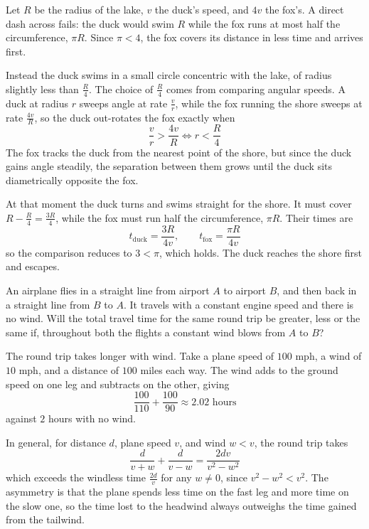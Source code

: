 \begin{solution}
Let $R$ be the radius of the lake, $v$ the duck's speed, and $4v$ the fox's. A direct dash across fails: the duck would swim $R$ while the fox runs at most half the circumference, $\pi R$. Since $\pi < 4$, the fox covers its distance in less time and arrives first.

Instead the duck swims in a small circle concentric with the lake, of radius slightly less than $\tfrac{R}{4}$. The choice of $\tfrac{R}{4}$ comes from comparing angular speeds. A duck at radius $r$ sweeps angle at rate $\tfrac{v}{r}$, while the fox running the shore sweeps at rate $\tfrac{4v}{R}$, so the duck out-rotates the fox exactly when
\[
\frac{v}{r} > \frac{4v}{R} \iff r < \frac{R}{4}
\]
The fox tracks the duck from the nearest point of the shore, but since the duck gains angle steadily, the separation between them grows until the duck sits diametrically opposite the fox.

At that moment the duck turns and swims straight for the shore. It must cover $R - \tfrac{R}{4} = \tfrac{3R}{4}$, while the fox must run half the circumference, $\pi R$. Their times are
\[
t_{\text{duck}} = \frac{3R}{4v}, \qquad t_{\text{fox}} = \frac{\pi R}{4v}
\]
so the comparison reduces to $3 < \pi$, which holds. The duck reaches the shore first and escapes.
\end{solution}

\newpage

\begin{problem}
An airplane flies in a straight line from airport $A$ to airport $B$, and then back in a straight line from $B$ to $A$. It travels with a constant engine speed and there is no wind. Will the total travel time for the same round trip be greater, less or the same if, throughout both the flights a constant wind blows from $A$ to $B$?
\end{problem}


\begin{solution}
The round trip takes longer with wind. Take a plane speed of $100$ mph, a wind of $10$ mph, and a distance of $100$ miles each way. The wind adds to the ground speed on one leg and subtracts on the other, giving
\[
\frac{100}{110} + \frac{100}{90} \approx 2.02 \text{ hours}
\]
against $2$ hours with no wind.

In general, for distance $d$, plane speed $v$, and wind $w < v$, the round trip takes
\[
\frac{d}{v+w} + \frac{d}{v-w} = \frac{2dv}{v^2 - w^2}
\]
which exceeds the windless time $\frac{2d}{v}$ for any $w \neq 0$, since $v^2 - w^2 < v^2$. The asymmetry is that the plane spends less time on the fast leg and more time on the slow one, so the time lost to the headwind always outweighs the time gained from the tailwind.
\end{solution}

